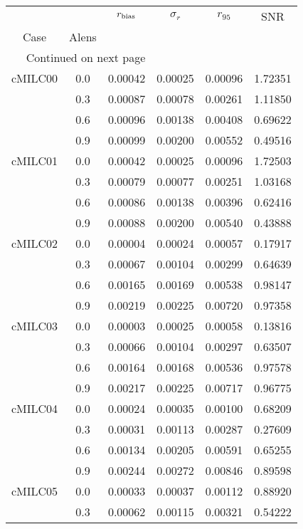 \begin{longtable}{cccccc}
\toprule
        &     &  $r_{\rm bias}$  &  $\sigma_r$ &  $r_{95}$ &     SNR \\
Case & Alens &                  &             &           &         \\
\midrule
\endhead
\midrule
\multicolumn{3}{r}{{Continued on next page}} \\
\midrule
\endfoot

\bottomrule
\endlastfoot
cMILC00 & 0.0 & 0.00042 & 0.00025 & 0.00096 & 1.72351 \\
        & 0.3 & 0.00087 & 0.00078 & 0.00261 & 1.11850 \\
        & 0.6 & 0.00096 & 0.00138 & 0.00408 & 0.69622 \\
        & 0.9 & 0.00099 & 0.00200 & 0.00552 & 0.49516 \\
cMILC01 & 0.0 & 0.00042 & 0.00025 & 0.00096 & 1.72503 \\
        & 0.3 & 0.00079 & 0.00077 & 0.00251 & 1.03168 \\
        & 0.6 & 0.00086 & 0.00138 & 0.00396 & 0.62416 \\
        & 0.9 & 0.00088 & 0.00200 & 0.00540 & 0.43888 \\
cMILC02 & 0.0 & 0.00004 & 0.00024 & 0.00057 & 0.17917 \\
        & 0.3 & 0.00067 & 0.00104 & 0.00299 & 0.64639 \\
        & 0.6 & 0.00165 & 0.00169 & 0.00538 & 0.98147 \\
        & 0.9 & 0.00219 & 0.00225 & 0.00720 & 0.97358 \\
cMILC03 & 0.0 & 0.00003 & 0.00025 & 0.00058 & 0.13816 \\
        & 0.3 & 0.00066 & 0.00104 & 0.00297 & 0.63507 \\
        & 0.6 & 0.00164 & 0.00168 & 0.00536 & 0.97578 \\
        & 0.9 & 0.00217 & 0.00225 & 0.00717 & 0.96775 \\
cMILC04 & 0.0 & 0.00024 & 0.00035 & 0.00100 & 0.68209 \\
        & 0.3 & 0.00031 & 0.00113 & 0.00287 & 0.27609 \\
        & 0.6 & 0.00134 & 0.00205 & 0.00591 & 0.65255 \\
        & 0.9 & 0.00244 & 0.00272 & 0.00846 & 0.89598 \\
cMILC05 & 0.0 & 0.00033 & 0.00037 & 0.00112 & 0.88920 \\
        & 0.3 & 0.00062 & 0.00115 & 0.00321 & 0.54222 \\

\end{longtable}
